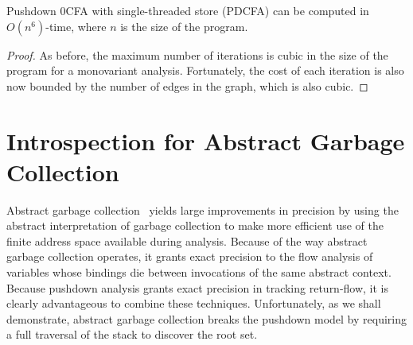 \begin{theorem}
Pushdown 0CFA with single-threaded store (PDCFA) can be computed in $O(n^6)$-time, where $n$ is the
size of the program.
\end{theorem}
\begin{proof}
As before, the maximum number of iterations is cubic in the size of
the program for a monovariant analysis.
Fortunately, the cost of each iteration is also now bounded by the number
of edges in the graph, which is also cubic.
\end{proof}







\section{Introspection for Abstract Garbage Collection}
Abstract garbage collection~\cite{mattmight:Might:2006:GammaCFA} yields large
improvements in precision by using the abstract interpretation of garbage
collection to make more efficient use of the finite address space available
during analysis.
Because of the way abstract garbage collection operates, it grants exact
precision to the flow analysis of variables whose bindings die
between invocations of the same abstract context.
Because pushdown analysis grants exact precision in tracking return-flow, it is
clearly advantageous to combine these techniques.
Unfortunately, as we shall demonstrate, abstract garbage collection
breaks the pushdown model by requiring a full traversal of the stack to discover the
root set.


